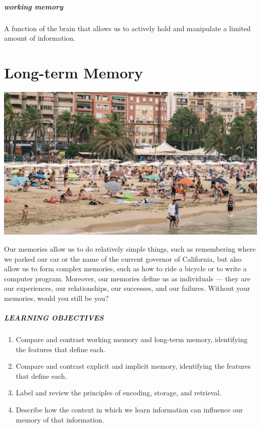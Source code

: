 \documentclass[
]{krantz}
\providecommand{\tightlist}{%
  \setlength{\itemsep}{0pt}\setlength{\parskip}{0pt}}
\begin{document}
\paragraph*{working memory}\label{working-memory-1}

A function of the brain that allows us to actively hold and manipulate a limited amount of information.

\chapter{Long-term Memory}\label{long-term-memory-chapter}

\begin{center}\includegraphics[width=1\linewidth]{images/ch5/fig0} \end{center}

Our memories allow us to do relatively simple things, such as remembering where we parked our car or the name of the current governor of California, but also allow us to form complex memories, such as how to ride a bicycle or to write a computer program. Moreover, our memories define us as individuals --- they are our experiences, our relationships, our successes, and our failures. Without your memories, would you still be you?

\paragraph*{LEARNING OBJECTIVES}\label{learning-objectives-4}

\begin{enumerate}
\def\labelenumi{\arabic{enumi}.}
\tightlist
\item
  Compare and contrast working memory and long-term memory, identifying the features that define each.
\item
  Compare and contrast explicit and implicit memory, identifying the features that define each.
\item
  Label and review the principles of encoding, storage, and retrieval.
\item
  Describe how the context in which we learn information can influence our memory of that information.
\end{enumerate}
\end{document}
